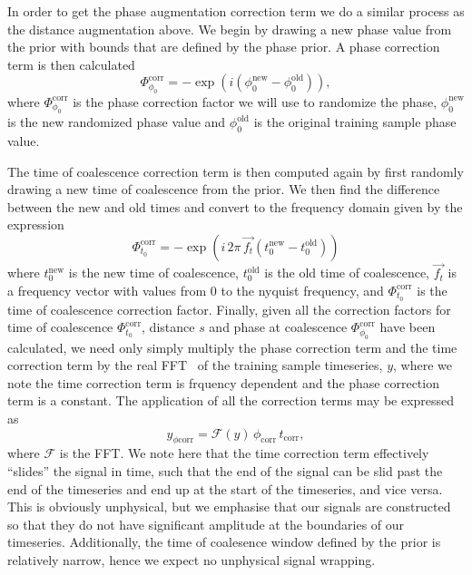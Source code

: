 %
%
In order to get the phase augmentation correction term we do a similar 
process as the distance augmentation above. We begin by drawing 
a new phase value from the prior with bounds that are defined by the 
phase prior. A phase correction term is then calculated
%
\begin{equation}
    \Phi_{\phi_0}^{\textrm{corr}} = -\exp\left(i(\phi_0^{\text{new}} - \phi_0^{\text{old}})\right),
\end{equation}
%
where $\Phi_{\phi_0}^{\textrm{corr}}$ is the phase correction factor we 
will use to randomize the phase, $\phi_0^{\textrm{new}}$ is the new 
randomized phase value and $\phi_0^{\textrm{old}}$ is the 
original training sample phase value.

%
%

The time of coalescence correction term is then computed 
again by first randomly drawing a new time of coalescence from the 
prior. We then find the difference between the new and old 
times and convert to the frequency domain given by the expression 
%
\begin{equation}
    \Phi_{t_0}^{\textrm{corr}} = -\exp\left(i\,2\pi\,\vec{f_t}(t_0^{\text{new}} - t_0^{\text{old}})\right)
\end{equation}
%
where $t_0^{\textrm{new}}$ is the new time of coalescence, 
$t_0^{\textrm{old}}$ is the old time of coalescence, 
$\vec{f_t}$ is a frequency vector with values from 0 to the nyquist 
frequency, and $\Phi_{t_0}^{\textrm{corr}}$ is the time of coalescence 
correction factor.
Finally, given all the correction 
factors for time of coalescence $\Phi_{t_0}^{\textrm{corr}}$, distance $s$ and 
phase at coalescence $\Phi_{\phi_0}^{\textrm{corr}}$ have been calculated, 
we need only simply multiply the phase correction term and the 
time correction term by the real \ac{FFT}~\cite{Cooley1965AnAF} 
of the training sample 
timeseries, $y$, where we note the time correction term is 
frquency dependent and the phase correction term is a constant. 
The application of all the correction terms may be 
expressed as
%
\begin{equation}
    y_{\phi \textrm{corr}} = \mathcal{F}(y)\, \phi_{\textrm{corr}}\, t_{\textrm{corr}},
\end{equation}
%
where $\mathcal{F}$ is the \ac{FFT}. %
%
%
We note here that the time correction term effectively ``slides'' the signal 
in time, such that the end of the signal can be slid past the end of 
the timeseries and end up at the start of the timeseries, and vice versa. 
This is obviously unphysical, but we emphasise that our signals are 
constructed so that they do not have significant amplitude at the 
boundaries of our timeseries. Additionally, the time of coalesence 
window defined by the prior is relatively narrow, hence we expect 
no unphysical signal wrapping.


